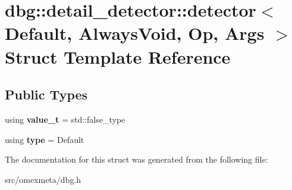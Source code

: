 \hypertarget{structdbg_1_1detail__detector_1_1detector}{}\section{dbg\+:\+:detail\+\_\+detector\+:\+:detector$<$ Default, Always\+Void, Op, Args $>$ Struct Template Reference}
\label{structdbg_1_1detail__detector_1_1detector}
\subsection*{Public Types}
\begin{DoxyCompactItemize}
\item 
\mbox{\label{structdbg_1_1detail__detector_1_1detector_af1b6da4282d723669e926c52f446a989}} 
using {\bfseries value\+\_\+t} = std\+::false\+\_\+type
\item 
\mbox{\label{structdbg_1_1detail__detector_1_1detector_aab6b446944545683b9533ea8fc623480}} 
using {\bfseries type} = Default
\end{DoxyCompactItemize}


The documentation for this struct was generated from the following file\+:\begin{DoxyCompactItemize}
\item 
src/omexmeta/dbg.\+h\end{DoxyCompactItemize}
